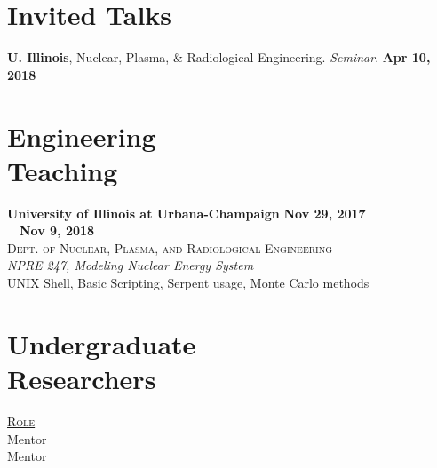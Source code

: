 \documentclass[margin,line]{resume}
\begin{document}
\begin{resume}
    \section{\mysidestyle Invited Talks}
      \textbf{U. Illinois}, Nuclear, Plasma, \& Radiological Engineering. \emph{Seminar}.  \hfill\textbf{Apr 10, 2018}\\
    \section{\mysidestyle Engineering\\Teaching}
    \textbf{University of Illinois at Urbana-Champaign} \hfill \textbf{Nov 29, 2017}\\
    \mbox{ }~\hfill \textbf{Nov 9, 2018}\\
    \textsc{Dept. of Nuclear, Plasma, and Radiological Engineering}\\ 
               \textsl{NPRE 247, Modeling Nuclear Energy System}\\
               UNIX Shell, Basic Scripting, Serpent usage, Monte Carlo methods
               \vspace{2mm}
    \section{\mysidestyle Undergraduate\\Researchers}
    \hfill\textsc{\underline{Role}}\\
    \hfill Mentor\\
    \hfill Mentor\\

\end{resume}
\end{document}
